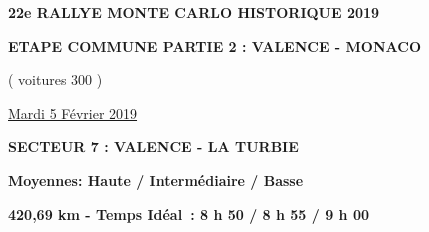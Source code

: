 \documentclass{article}%
\begin{document}
%
\normalsize%
\begin{center} \textbf{\LARGE{22e RALLYE MONTE CARLO HISTORIQUE 2019}} \end{center}%
\begin{center} \textbf{ETAPE COMMUNE PARTIE 2 : VALENCE - MONACO} \end{center}%
\begin{center} ( voitures 300 ) \end{center}%
\begin{flushright} \underline{Mardi 5 Février 2019} \end{flushright}%
\begin{flushleft} \textbf{SECTEUR 7 : VALENCE - LA TURBIE} \end{flushleft}%
\begin{flushright} \textbf{Moyennes: Haute / Intermédiaire / Basse} \end{flushright}%
\begin{flushright} \textbf{420,69 km - Temps Idéal : 8 h 50 / 8 h 55 / 9 h 00} \end{flushright}%
\end{document}
